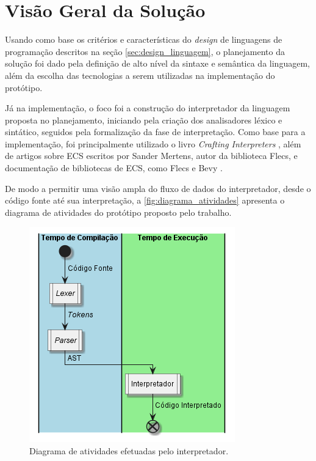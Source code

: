 \section{Visão Geral da Solução}

Usando como base os critérios e características do \textit{design} de linguagens de programação descritos na seção \ref{sec:design_linguagem}, o planejamento da solução foi dado pela definição de alto nível da sintaxe e semântica da linguagem, além da escolha das tecnologias a serem utilizadas na implementação do protótipo.

Já na implementação, o foco foi a construção do interpretador da linguagem proposta no planejamento, iniciando pela criação dos analisadores léxico e sintático, seguidos pela formalização da fase de interpretação. Como base para a implementação, foi principalmente utilizado o livro \textit{Crafting Interpreters} \cite{craftinginterpreters}, além de artigos sobre ECS escritos por Sander Mertens, autor da biblioteca Flecs, e documentação de bibliotecas de ECS, como Flecs \cite{flecs} e Bevy \cite{bevy}.

De modo a permitir uma visão ampla do fluxo de dados do interpretador, desde o código fonte até sua interpretação, a \autoref{fig:diagrama_atividades} apresenta o diagrama de atividades do protótipo proposto pelo trabalho.

\begin{figure}[H]
	\centering
	\includegraphics[width=0.25\textheight]{../diagrams/diagrama_atividades.png}
	\caption{Diagrama de atividades efetuadas pelo interpretador.}
	\label{fig:diagrama_atividades}
\end{figure}

